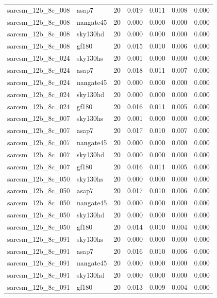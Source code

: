 \begin{tabular}{llrrrrr}
sarcsm\_12b\_8c\_008 & asap7 & 20 & 0.019 & 0.011 & 0.008 & 0.000 \\
sarcsm\_12b\_8c\_008 & nangate45 & 20 & 0.000 & 0.000 & 0.000 & 0.000 \\
sarcsm\_12b\_8c\_008 & sky130hd & 20 & 0.000 & 0.000 & 0.000 & 0.000 \\
sarcsm\_12b\_8c\_008 & gf180 & 20 & 0.015 & 0.010 & 0.006 & 0.000 \\
sarcsm\_12b\_8c\_024 & sky130hs & 20 & 0.001 & 0.000 & 0.000 & 0.000 \\
sarcsm\_12b\_8c\_024 & asap7 & 20 & 0.018 & 0.011 & 0.007 & 0.000 \\
sarcsm\_12b\_8c\_024 & nangate45 & 20 & 0.000 & 0.000 & 0.000 & 0.000 \\
sarcsm\_12b\_8c\_024 & sky130hd & 20 & 0.000 & 0.000 & 0.000 & 0.000 \\
sarcsm\_12b\_8c\_024 & gf180 & 20 & 0.016 & 0.011 & 0.005 & 0.000 \\
sarcsm\_12b\_8c\_007 & sky130hs & 20 & 0.001 & 0.000 & 0.000 & 0.000 \\
sarcsm\_12b\_8c\_007 & asap7 & 20 & 0.017 & 0.010 & 0.007 & 0.000 \\
sarcsm\_12b\_8c\_007 & nangate45 & 20 & 0.000 & 0.000 & 0.000 & 0.000 \\
sarcsm\_12b\_8c\_007 & sky130hd & 20 & 0.000 & 0.000 & 0.000 & 0.000 \\
sarcsm\_12b\_8c\_007 & gf180 & 20 & 0.016 & 0.011 & 0.005 & 0.000 \\
sarcsm\_12b\_8c\_050 & sky130hs & 20 & 0.000 & 0.000 & 0.000 & 0.000 \\
sarcsm\_12b\_8c\_050 & asap7 & 20 & 0.017 & 0.010 & 0.006 & 0.000 \\
sarcsm\_12b\_8c\_050 & nangate45 & 20 & 0.000 & 0.000 & 0.000 & 0.000 \\
sarcsm\_12b\_8c\_050 & sky130hd & 20 & 0.000 & 0.000 & 0.000 & 0.000 \\
sarcsm\_12b\_8c\_050 & gf180 & 20 & 0.014 & 0.010 & 0.004 & 0.000 \\
sarcsm\_12b\_8c\_091 & sky130hs & 20 & 0.000 & 0.000 & 0.000 & 0.000 \\
sarcsm\_12b\_8c\_091 & asap7 & 20 & 0.016 & 0.010 & 0.006 & 0.000 \\
sarcsm\_12b\_8c\_091 & nangate45 & 20 & 0.000 & 0.000 & 0.000 & 0.000 \\
sarcsm\_12b\_8c\_091 & sky130hd & 20 & 0.000 & 0.000 & 0.000 & 0.000 \\
sarcsm\_12b\_8c\_091 & gf180 & 20 & 0.013 & 0.009 & 0.004 & 0.000 \\

\end{tabular}
